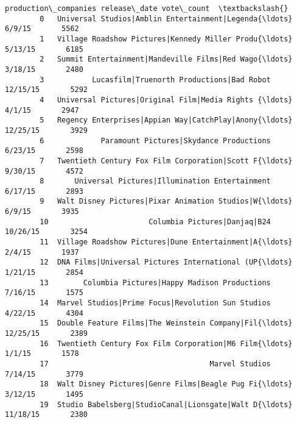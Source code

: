 \documentclass[11pt]{article}
\begin{document}
\begin{Verbatim}[commandchars=\\\{\}]
                                         production\_companies release\_date vote\_count  \textbackslash{}
        0   Universal Studios|Amblin Entertainment|Legenda{\ldots}       6/9/15       5562   
        1   Village Roadshow Pictures|Kennedy Miller Produ{\ldots}      5/13/15       6185   
        2   Summit Entertainment|Mandeville Films|Red Wago{\ldots}      3/18/15       2480   
        3           Lucasfilm|Truenorth Productions|Bad Robot     12/15/15       5292   
        4   Universal Pictures|Original Film|Media Rights {\ldots}       4/1/15       2947   
        5   Regency Enterprises|Appian Way|CatchPlay|Anony{\ldots}     12/25/15       3929   
        6             Paramount Pictures|Skydance Productions      6/23/15       2598   
        7   Twentieth Century Fox Film Corporation|Scott F{\ldots}      9/30/15       4572   
        8       Universal Pictures|Illumination Entertainment      6/17/15       2893   
        9   Walt Disney Pictures|Pixar Animation Studios|W{\ldots}       6/9/15       3935   
        10                       Columbia Pictures|Danjaq|B24     10/26/15       3254   
        11  Village Roadshow Pictures|Dune Entertainment|A{\ldots}       2/4/15       1937   
        12  DNA Films|Universal Pictures International (UP{\ldots}      1/21/15       2854   
        13        Columbia Pictures|Happy Madison Productions      7/16/15       1575   
        14  Marvel Studios|Prime Focus|Revolution Sun Studios      4/22/15       4304   
        15  Double Feature Films|The Weinstein Company|Fil{\ldots}     12/25/15       2389   
        16  Twentieth Century Fox Film Corporation|M6 Film{\ldots}       1/1/15       1578   
        17                                     Marvel Studios      7/14/15       3779   
        18  Walt Disney Pictures|Genre Films|Beagle Pug Fi{\ldots}      3/12/15       1495   
        19  Studio Babelsberg|StudioCanal|Lionsgate|Walt D{\ldots}     11/18/15       2380   
        

\end{Verbatim}
\end{document}
